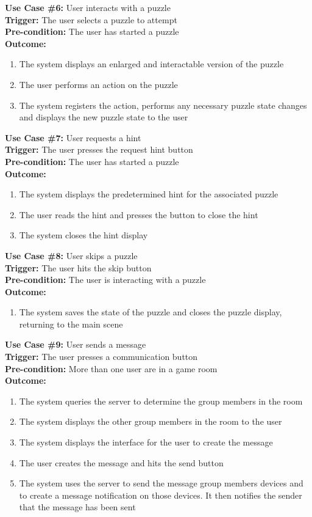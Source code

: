 \documentclass[12pt]{article}
\begin{document}
\textbf{Use Case \#6:} User interacts with a puzzle\\
\textbf{Trigger:} The user selects a puzzle to attempt\\
\textbf{Pre-condition:} The user has started a puzzle\\
\textbf{Outcome:}
\begin{enumerate} %
	\item The system displays an enlarged and interactable version of the puzzle
	\item The user performs an action on the puzzle
	\item The system registers the action, performs any necessary puzzle state changes and displays the new puzzle state to the user    
\end{enumerate}
\textbf{Use Case \#7:} User requests a hint\\
\textbf{Trigger:} The user presses the request hint button\\
\textbf{Pre-condition:} The user has started a puzzle\\
\textbf{Outcome:}
\begin{enumerate}
	\item The system displays the predetermined hint for the associated puzzle
	\item The user reads the hint and presses the button to close the hint
	\item The system closes the hint display
\end{enumerate}
\textbf{Use Case \#8:} User skips a puzzle\\
\textbf{Trigger:} The user hits the skip button\\
\textbf{Pre-condition:} The user is interacting with a puzzle\\
\textbf{Outcome:}
\begin{enumerate}
	\item The system saves the state of the puzzle and closes the puzzle display, returning to the main scene
\end{enumerate}
\textbf{Use Case \#9:} User sends a message\\
\textbf{Trigger:} The user presses a communication button\\
\textbf{Pre-condition:} More than one user are in a game room\\
\textbf{Outcome:}
\begin{enumerate}
	\item The system queries the server to determine the group members in the room
	\item The system displays the other group members in the room to the user
        \item The system displays the interface for the user to create the message
        \item The user creates the message and hits the send button
        \item The system uses the server to send the message group members devices and to create a message notification on those devices. It then notifies the sender that the message has been sent
\end{enumerate}
\end{document}
